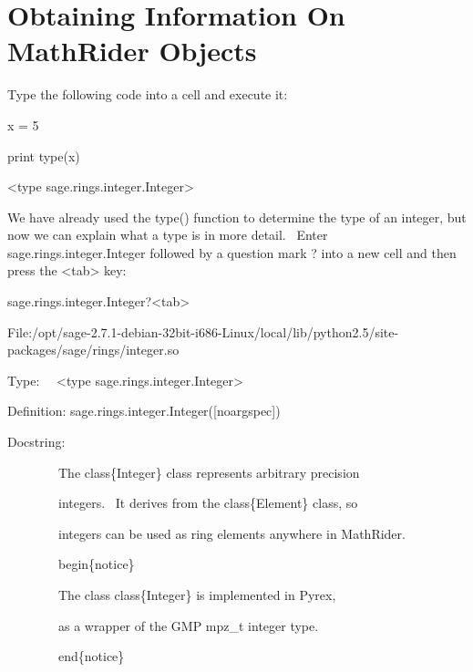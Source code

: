 \documentclass[12pt,twoside]{book}
\begin{document}
\bigskip

\section[Obtaining Information On MathRider Objects]{Obtaining Information On MathRider Objects}
Type the following code into a cell and execute it:


\bigskip

x = 5

print type(x)

{\textbar}

{\textless}type
{\textquotesingle}sage.rings.integer.Integer{\textquotesingle}{\textgreater}


\bigskip

We have already used the type() function to determine the type of an
integer, but now we can explain what a type is in more detail. \ Enter
sage.rings.integer.Integer followed by a question mark
{\textquotesingle}?{\textquotesingle} into a new cell and then press
the {\textless}tab{\textgreater} key:


\bigskip

sage.rings.integer.Integer?{\textless}tab{\textgreater}

{\textbar}

File:/opt/sage{}-2.7.1{}-debian{}-32bit{}-i686{}-Linux/local/lib/python2.5/site{}-packages/sage/rings/integer.so


Type: \ \ {\textless}type
{\textquotesingle}sage.rings.integer.Integer{\textquotesingle}{\textgreater}


Definition: sage.rings.integer.Integer([noargspec]) 


\bigskip

Docstring: 


\bigskip

\ \ \ \ \ \ \ \ The class\{Integer\} class represents arbitrary
precision 

\ \ \ \ \ \ \ \ integers. \ It derives from the class\{Element\} class,
so 

\ \ \ \ \ \ \ \ integers can be used as ring elements anywhere in
MathRider. 


\bigskip

\ \ \ \ \ \ \ \ begin\{notice\} 

\ \ \ \ \ \ \ \ The class class\{Integer\} is implemented in Pyrex, 

\ \ \ \ \ \ \ \ as a wrapper of the GMP mpz\_t integer type. 

\ \ \ \ \ \ \ \ end\{notice\} 
\end{document}

